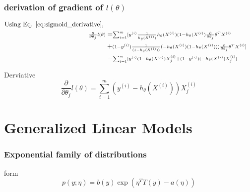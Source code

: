 \documentclass[11pt]{beamer}
\begin{document}
\begin{frame}
	\frametitle{derivation of gradient of $l(\theta)$}
	\begin{center}
	\begin{align*}
	\noindent \textrm{Using Eq. \ref{eq:sigmoid_derivative}, } \\
	\scriptstyle \frac{\partial}{\partial \theta_j} l(\theta) 
		 &= \scriptstyle \sum_{i=1}^{m} [y^{(i)} \frac{1}{h_\theta(X^{(i)})}  h_\theta(X^{(i)}) (1-h_\theta( X^{(i)}) \frac{\partial}{\partial \theta_j}\theta^T X^{(i)} \\
	\scriptstyle	&+\scriptstyle (1-y^{(i)}) \frac{1}{(1-h_\theta(X^{(i)}))}  (-h_\theta(X^{(i)}) (1-h_\theta(X^{(i)}))) \frac{\partial}{\partial \theta_j} \theta^T X^{(i)} ] \\
	\scriptstyle	&= \scriptstyle \sum_{i=1}^{m} [y^{(i)}  (1-h_\theta( X^{(i)}) X^{(i)}_j + (1-y^{(i)})  (-h_\theta(X^{(i)})  X^{(i)}_j ]	
	\end{align*} \vspace{-20pt}
	\begin{block}{Derviative}
	\begin{equation*}
		\frac{\partial}{\partial \theta_j} l(\theta) = \sum_{i=1}^{m} (y^{(i)} -h_\theta(X^{(i)}))  X^{(i)}_j 
	\end{equation*}
	\end{block}
	\end{center}
\end{frame}


\section{Generalized Linear Models}
\begin{frame}
	\frametitle{Exponential family of distributions}
	\begin{block}{form}
	\begin{equation*}
	p(y;\eta) = b(y) \exp{(\eta^T T(y) - a(\eta))}
	\end{equation*}
	\end{block}
\end{frame}
\end{document}
